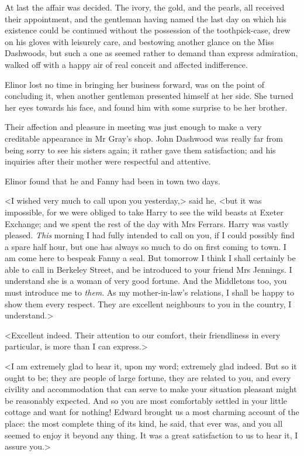 At last the affair was decided. The ivory, the gold, and the pearls, all received their appointment, and the gentleman having named the last day on which his existence could be continued without the possession of the toothpick-case, drew on his gloves with leisurely care, and bestowing another glance on the Miss Dashwoods, but such a one as seemed rather to demand than express admiration, walked off with a happy air of real conceit and affected indifference.

Elinor lost no time in bringing her business forward, was on the point of concluding it, when another gentleman presented himself at her side. She turned her eyes towards his face, and found him with some surprise to be her brother.

Their affection and pleasure in meeting was just enough to make a very creditable appearance in Mr Gray's shop. John Dashwood was really far from being sorry to see his sisters again; it rather gave them satisfaction; and his inquiries after their mother were respectful and attentive.

Elinor found that he and Fanny had been in town two days.

<I wished very much to call upon you yesterday,> said he, <but it was impossible, for we were obliged to take Harry to see the wild beasts at Exeter Exchange; and we spent the rest of the day with Mrs Ferrars. Harry was vastly pleased. \textit{This} morning I had fully intended to call on you, if I could possibly find a spare half hour, but one has always so much to do on first coming to town. I am come here to bespeak Fanny a seal. But tomorrow I think I shall certainly be able to call in Berkeley Street, and be introduced to your friend Mrs Jennings. I understand she is a woman of very good fortune. And the Middletons too, you must introduce me to \textit{them}. As my mother-in-law's relations, I shall be happy to show them every respect. They are excellent neighbours to you in the country, I understand.>

<Excellent indeed. Their attention to our comfort, their friendliness in every particular, is more than I can express.>

<I am extremely glad to hear it, upon my word; extremely glad indeed. But so it ought to be; they are people of large fortune, they are related to you, and every civility and accommodation that can serve to make your situation pleasant might be reasonably expected. And so you are most comfortably settled in your little cottage and want for nothing! Edward brought us a most charming account of the place: the most complete thing of its kind, he said, that ever was, and you all seemed to enjoy it beyond any thing. It was a great satisfaction to us to hear it, I assure you.>

